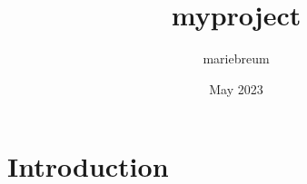 \documentclass{article}
\title{myproject}
\author{mariebreum }
\date{May 2023}
\begin{document}
\maketitle

\section{Introduction}
\end{document}
